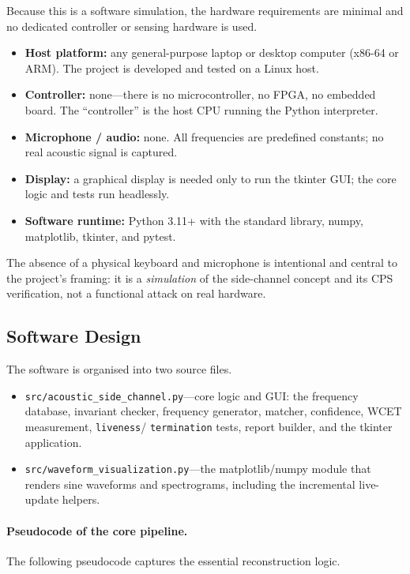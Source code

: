 \documentclass[11pt,a4paper]{article}
\begin{document}
Because this is a software simulation, the hardware requirements are minimal
and no dedicated controller or sensing hardware is used.

\begin{itemize}
    \item \textbf{Host platform:} any general-purpose laptop or desktop
          computer (x86-64 or ARM). The project is developed and tested on a
          Linux host.
    \item \textbf{Controller:} none---there is no microcontroller, no FPGA, no
          embedded board. The ``controller'' is the host CPU running the Python
          interpreter.
    \item \textbf{Microphone / audio:} none. All frequencies are predefined
          constants; no real acoustic signal is captured.
    \item \textbf{Display:} a graphical display is needed only to run the
          tkinter GUI; the core logic and tests run headlessly.
    \item \textbf{Software runtime:} Python 3.11+ with the standard library,
          numpy, matplotlib, tkinter, and pytest.
\end{itemize}

The absence of a physical keyboard and microphone is intentional and central to
the project's framing: it is a \emph{simulation} of the side-channel concept
and its CPS verification, not a functional attack on real hardware.

\subsection{Software Design}

The software is organised into two source files.

\begin{itemize}
    \item \texttt{src/acoustic\_side\_channel.py}---core logic and GUI:
          the frequency database, invariant checker, frequency generator,
          matcher, confidence, WCET measurement, \texttt{liveness}/
         \texttt{termination} tests,
          report builder, and the tkinter application.
    \item \texttt{src/waveform\_visualization.py}---the matplotlib/numpy
          module that renders sine waveforms and spectrograms, including the
          incremental live-update helpers.
\end{itemize}

\paragraph{Pseudocode of the core pipeline.}
The following pseudocode captures the essential reconstruction logic.
\end{document}
